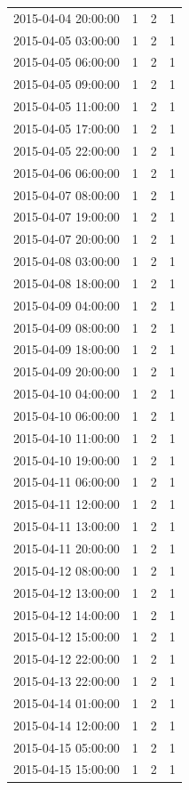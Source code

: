 \begin{tabular}{lrrr}
2015-04-04 20:00:00 & 1 & 2 & 1 \\
2015-04-05 03:00:00 & 1 & 2 & 1 \\
2015-04-05 06:00:00 & 1 & 2 & 1 \\
2015-04-05 09:00:00 & 1 & 2 & 1 \\
2015-04-05 11:00:00 & 1 & 2 & 1 \\
2015-04-05 17:00:00 & 1 & 2 & 1 \\
2015-04-05 22:00:00 & 1 & 2 & 1 \\
2015-04-06 06:00:00 & 1 & 2 & 1 \\
2015-04-07 08:00:00 & 1 & 2 & 1 \\
2015-04-07 19:00:00 & 1 & 2 & 1 \\
2015-04-07 20:00:00 & 1 & 2 & 1 \\
2015-04-08 03:00:00 & 1 & 2 & 1 \\
2015-04-08 18:00:00 & 1 & 2 & 1 \\
2015-04-09 04:00:00 & 1 & 2 & 1 \\
2015-04-09 08:00:00 & 1 & 2 & 1 \\
2015-04-09 18:00:00 & 1 & 2 & 1 \\
2015-04-09 20:00:00 & 1 & 2 & 1 \\
2015-04-10 04:00:00 & 1 & 2 & 1 \\
2015-04-10 06:00:00 & 1 & 2 & 1 \\
2015-04-10 11:00:00 & 1 & 2 & 1 \\
2015-04-10 19:00:00 & 1 & 2 & 1 \\
2015-04-11 06:00:00 & 1 & 2 & 1 \\
2015-04-11 12:00:00 & 1 & 2 & 1 \\
2015-04-11 13:00:00 & 1 & 2 & 1 \\
2015-04-11 20:00:00 & 1 & 2 & 1 \\
2015-04-12 08:00:00 & 1 & 2 & 1 \\
2015-04-12 13:00:00 & 1 & 2 & 1 \\
2015-04-12 14:00:00 & 1 & 2 & 1 \\
2015-04-12 15:00:00 & 1 & 2 & 1 \\
2015-04-12 22:00:00 & 1 & 2 & 1 \\
2015-04-13 22:00:00 & 1 & 2 & 1 \\
2015-04-14 01:00:00 & 1 & 2 & 1 \\
2015-04-14 12:00:00 & 1 & 2 & 1 \\
2015-04-15 05:00:00 & 1 & 2 & 1 \\
2015-04-15 15:00:00 & 1 & 2 & 1 \\

\end{tabular}
